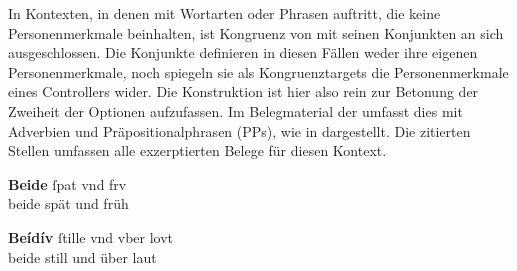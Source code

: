 In Kontexten, in denen  mit Wortarten oder Phrasen
auftritt, die keine Personenmerkmale beinhalten, ist Kongruenz von
 mit seinen Konjunkten an sich ausgeschlossen. Die Konjunkte
definieren in diesen Fällen weder ihre eigenen Personen\-merkmale, noch
spiegeln sie als Kongruenztargets die Personenmerkmale eines Controllers wider.
Die Konstruktion ist hier also rein zur Betonung der Zweiheit der Optionen
aufzufassen. Im Belegmaterial der \KC{} umfasst dies  mit Adverbien und Präpositionalphrasen (PPs), wie in
 dargestellt. Die zitierten Stellen
umfassen alle exzerptierten Belege für diesen Kontext.

\begin{exe}
\ex \label{ex:syntintvar1}
	\begin{xlist}
	\ex \begin{taggedline}{\parencites[\pno~18\rb, 5]{kc:B1}[vgl.~abweichend][6289]{schroeder1895}}
	\end{taggedline}

	\ex \begin{taggedline}{\parencites[\pno~19\va, 15]{kc:B1}[zu][6834--6839]{schroeder1895}}
	\end{taggedline}

	\ex \label{ex:syntintvar1_3}
	\gll \textbf{Beide} ſpat vnd frv \\
		beide spät und früh \\
	\begin{taggedline}{\parencites[\pno~33\ra, 36]{kc:VB}[zu][6834--6839]{schroeder1895}}
	\trans {}
	\end{taggedline}
\end{xlist}

\ex \label{ex:syntintvar3}
	\begin{xlist}
	\ex \begin{taggedline}{\parencites[\pno~22\va, 1]{kc:B1}[zu][8014--8020]{schroeder1895}}
	\end{taggedline}

	\ex \label{ex:syntintvar3_2}
		\gll \textbf{Beídív} ſtille vnd vber lovt \\
		beide still und über laut \\
	\begin{taggedline}{\parencites[\pno~38\vb, 24]{kc:VB}[zu][8014--8020]{schroeder1895}}
	\trans {}
	\end{taggedline}
\end{xlist}
\end{exe}

